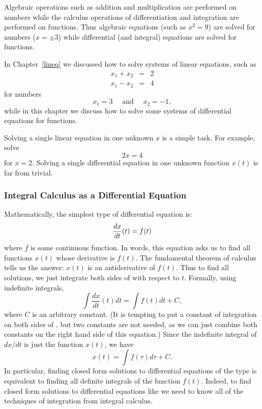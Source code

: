 \documentclass{ximera}
\begin{document}
Algebraic operations such as addition and multiplication are
performed on numbers while the calculus operations of
differentiation and integration are performed on functions.
Thus algebraic equations (such as $x^2=9$) are solved for
numbers ($x=\pm 3$) while differential (and integral) equations
are solved for functions.

In Chapter~\ref{lineq} we discussed how to solve systems of
linear equations, such as
\begin{eqnarray*}
x_1 + x_2 & = & 2 \\
x_1 - x_2 & = & 4
\end{eqnarray*}
for numbers
\[
x_1=3 \quad \mbox{ and } \quad x_2=-1,
\]
while in this chapter we discuss how to solve some systems of
differential equations for functions.

Solving a single linear equation in one unknown $x$ is a simple
task.  For example, solve
\[
2x = 4
\]
for $x=2$.  Solving a single differential equation in one unknown function
$x(t)$ is far from trivial.

\subsubsection*{Integral Calculus as a Differential Equation}

Mathematically, the simplest type of differential equation is:
\begin{equation} \label{e:intcalc}
\dps\frac{dx}{dt}(t) = f(t)
\end{equation}
where $f$ is some continuous function.  In words, this equation asks us
to find all functions $x(t)$ whose derivative is $f(t)$.  The fundamental
theorem of calculus tells us the answer: $x(t)$ is an antiderivative of
$f(t)$.  Thus to find all solutions, we just integrate both sides of
 with respect to $t$.  Formally, using indefinite integrals, 
\begin{equation}  \label{E:integrate}
\int \frac{dx}{dt}(t)dt = \int f(t)dt + C,
\end{equation}
where $C$ is an arbitrary constant.  (It is tempting to put a constant of
integration on both sides of , but two constants are not 
needed, as we can just combine both constants on the right hand side of
this equation.)   Since the indefinite integral of $dx/dt$ is just the
function $x(t)$, we have 
\begin{equation}  \label{e:intcalcsoln}
x(t) = \int f(\tau) d\tau + C.
\end{equation}
In particular, finding closed form solutions to differential equations
of the type  is equivalent to finding all definite
integrals of the function $f(t)$.  Indeed, to find closed form solutions 
to differential equations like  we need to know all of the 
techniques of integration from integral calculus.
\end{document}
